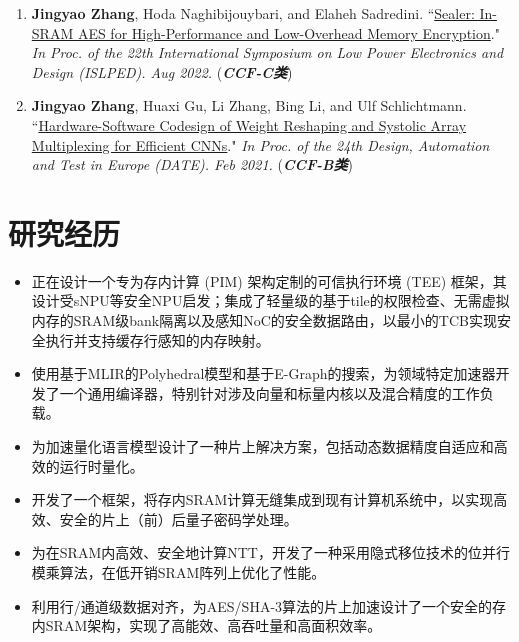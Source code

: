 \documentclass{resume}
\begin{document}
\begin{enumerate}[label=\arabic*., itemsep=1pt, topsep=3pt]
    \item \textbf{Jingyao Zhang}, Hoda Naghibijouybari, and Elaheh Sadredini. ``\href{https://arxiv.org/pdf/2207.01298.pdf}{Sealer: In-SRAM AES for High-Performance and Low-Overhead Memory Encryption}." \textit{In Proc. of the 22th International Symposium on Low Power Electronics and Design (ISLPED). Aug 2022.} (\textbf{\textit{CCF-C类}})

    \item \textbf{Jingyao Zhang}, Huaxi Gu, Li Zhang, Bing Li, and Ulf Schlichtmann. ``\href{https://drive.google.com/file/d/1vOt_0eP0xW03lu6KngMNexirfjsxyFDI/view}{Hardware-Software Codesign of Weight Reshaping and Systolic Array Multiplexing for Efficient CNNs}." \textit{In Proc. of the 24th Design, Automation and Test in Europe (DATE). Feb 2021.} (\textbf{\textit{CCF-B类}})
\end{enumerate}


\section{研究经历}
\vspace{-8pt}
\begin{itemize}
    \item 正在设计一个专为存内计算 (PIM) 架构定制的可信执行环境 (TEE) 框架，其设计受sNPU等安全NPU启发；集成了轻量级的基于tile的权限检查、无需虚拟内存的SRAM级bank隔离以及感知NoC的安全数据路由，以最小的TCB实现安全执行并支持缓存行感知的内存映射。
    \item 使用基于MLIR的Polyhedral模型和基于E-Graph的搜索，为领域特定加速器开发了一个通用编译器，特别针对涉及向量和标量内核以及混合精度的工作负载。
    \item 为加速量化语言模型设计了一种片上解决方案，包括动态数据精度自适应和高效的运行时量化。
    \item 开发了一个框架，将存内SRAM计算无缝集成到现有计算机系统中，以实现高效、安全的片上（前）后量子密码学处理。
    \item 为在SRAM内高效、安全地计算NTT，开发了一种采用隐式移位技术的位并行模乘算法，在低开销SRAM阵列上优化了性能。
    \item 利用行/通道级数据对齐，为AES/SHA-3算法的片上加速设计了一个安全的存内SRAM架构，实现了高能效、高吞吐量和高面积效率。
\end{itemize}
\end{document}
